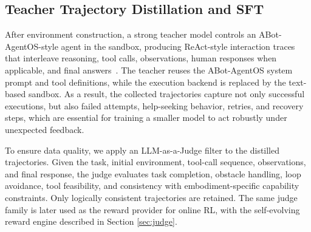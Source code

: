 \subsection{Teacher Trajectory Distillation and SFT}
\label{sec:trajectory-distillation}

After environment construction, a strong teacher model controls an
ABot-AgentOS-style agent in the sandbox, producing ReAct-style
interaction traces that interleave reasoning, tool calls, observations,
human responses when applicable, and final answers~\cite{yao2022react}.
The teacher reuses the ABot-AgentOS system prompt and tool definitions,
while the execution backend is replaced by the text-based sandbox. As a
result, the collected trajectories capture not only successful
executions, but also failed attempts, help-seeking behavior, retries, and
recovery steps, which are essential for training a smaller model to act
robustly under unexpected feedback.




To ensure data quality, we apply an LLM-as-a-Judge filter to the
distilled trajectories. Given the task, initial environment, tool-call
sequence, observations, and final response, the judge evaluates task
completion, obstacle handling, loop avoidance, tool feasibility, and
consistency with embodiment-specific capability constraints. Only
logically consistent trajectories are retained. The same judge family is
later used as the reward provider for online RL, with the self-evolving
reward engine described in Section \ref{sec:judge}.


